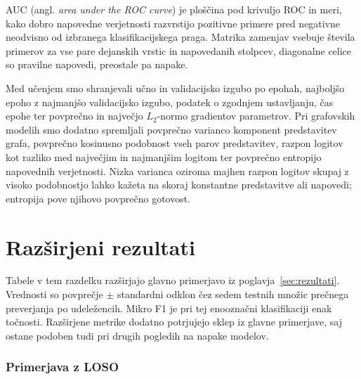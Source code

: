 AUC (angl. \emph{area under the ROC curve}) je ploščina pod krivuljo ROC in meri, kako dobro napovedne verjetnosti razvrstijo pozitivne primere pred negativne neodvisno od izbranega klasifikacijskega praga.
Matrika zamenjav vsebuje števila primerov za vse pare dejanskih vrstic in napovedanih stolpcev, diagonalne celice so pravilne napovedi, preostale pa napake.

Med učenjem smo shranjevali učno in validacijsko izgubo po epohah, najboljšo epoho z najmanjšo validacijsko izgubo, podatek o zgodnjem ustavljanju, čas epohe ter povprečno in največjo $L_2$-normo gradientov parametrov.
Pri grafovskih modelih smo dodatno spremljali povprečno varianco komponent predstavitev grafa, povprečno kosinusno podobnost vseh parov predstavitev, razpon logitov kot razliko med največjim in najmanjšim logitom ter povprečno entropijo napovednih verjetnosti.
Nizka varianca oziroma majhen razpon logitov skupaj z visoko podobnostjo lahko kažeta na skoraj konstantne predstavitve ali napovedi; entropija pove njihovo povprečno gotovost.

\section{Razširjeni rezultati}
\label{app:razsirjeni-rezultati-binarna-valenca}

Tabele v tem razdelku razširjajo glavno primerjavo iz poglavja~\ref{sec:rezultati}.
Vrednosti so povprečje $\pm$ standardni odklon čez sedem testnih množic prečnega preverjanja po udeležencih.
Mikro F1 je pri tej enooznačni klasifikaciji enak točnosti.
Razširjene metrike dodatno potrjujejo sklep iz glavne primerjave, saj ostane podoben tudi pri drugih pogledih na napake modelov.









\newpage

\subsubsection*{Primerjava z LOSO}
\label{app:primerjava-loso}

